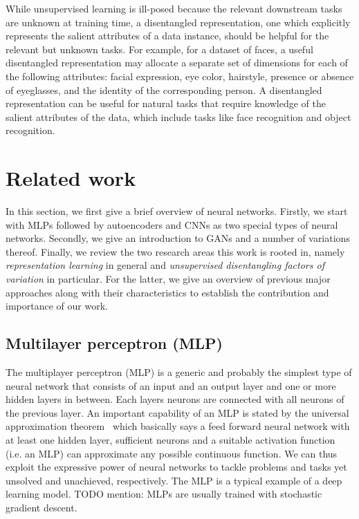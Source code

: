 \documentclass[12pt,a4paper]{article}
\begin{document}
While unsupervised learning is ill-posed because the relevant downstream tasks are unknown at training time, a disentangled representation, one which explicitly represents the salient attributes of a data instance, should be helpful for the relevant but unknown tasks. For example, for a dataset of faces, a useful disentangled representation may allocate a separate set of dimensions for each of the following attributes: facial expression, eye color, hairstyle, presence or absence of eyeglasses, and the identity of the corresponding person. A disentangled representation can be useful for natural tasks that require knowledge of the salient attributes of the data, which include tasks like face recognition and object recognition.

\section{Related work}
In this section, we first give a brief overview of neural networks. Firstly, we start with MLPs followed by autoencoders and CNNs as two special types of neural networks. Secondly, we give an introduction to GANs and a number of variations thereof. Finally, we review the two research areas this work is rooted in, namely \textit{representation learning} in general and \textit{unsupervised disentangling factors of variation} in particular. For the latter, we give an overview of previous major approaches along with their characteristics to establish the contribution and importance of our work.


\subsection{Multilayer perceptron (MLP)}\label{subsec:mlp}
The multiplayer perceptron (MLP) is a generic and probably the simplest type of neural network that consists of an input and an output layer and one or more hidden layers in between. Each layers neurons are connected with all neurons of the previous layer. An important capability of an MLP is stated by the universal approximation theorem~\cite{mlpUnivApprox} which basically says a feed forward neural network with at least one hidden layer, sufficient neurons and a suitable activation function (i.e. an MLP) can approximate any possible continuous function. We can thus exploit the expressive power of neural networks to tackle problems and tasks yet unsolved and unachieved, respectively. The MLP is a typical example of a deep learning model.
TODO mention: MLPs are usually trained with stochastic gradient descent.
\end{document}
